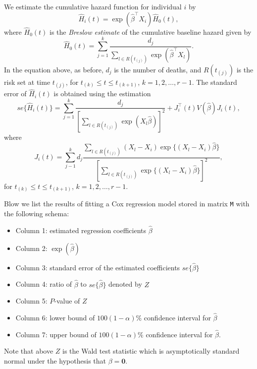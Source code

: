 We estimate the cumulative hazard function for individual $i$ by
\begin{equation*}
\hat{H}_i(t) = \exp(\hat{\beta}^\top X_i) \hat{H}_0(t), 
\end{equation*}
where $\hat{H}_0(t)$ is the \emph{Breslow estimate} of the cumulative baseline hazard given by
\begin{equation*}
\hat{H}_0(t) = \sum_{j=1}^{k} \frac{d_j}{\sum_{l\in R(t_{(j)})} \exp(\hat{\beta}^\top X_l)}.
\end{equation*}
In the equation above, as before, $d_j$ is the number of deaths, and $R(t_{(j)})$ is the risk set at time $t_{(j)}$, for $t_{(k)} \leq t \leq t_{(k+1)}$, $k=1,2,\ldots,r-1$.
The standard error of $\hat{H}_i(t)$ is obtained using the estimation
\begin{equation*}
se\{ \hat{H}_i(t) \} = \sum_{j=1}^{k} \frac{d_j}{ {\left[ \sum_{l\in R(t_{(j)})} \exp(X_l\hat{\beta}) \right]}^2 } + J_i^\top(t) V(\hat{\beta}) J_i(t),
\end{equation*}
where 
\begin{equation*}
J_i(t) = \sum_{j-1}^{k} d_j \frac{\sum_{l\in R(t_{(j)})} (X_l-X_i)\exp \{ (X_l-X_i)\hat{\beta} \}}{ {\left[ \sum_{l\in R(t_{(j)})} \exp\{(X_l-X_i)\hat{\beta}\} \right]}^2  },
\end{equation*}
for $t_{(k)} \leq t \leq t_{(k+1)}$, $k=1,2,\ldots,r-1$. 


\smallskip
{}
\smallskip

  
Blow we list the results of fitting a Cox regression model stored in matrix {\tt M} with the following schema:
\begin{itemize}
	\item Column 1: estimated regression coefficients $\hat{\beta}$
	\item Column 2: $\exp(\hat{\beta})$
	\item Column 3: standard error of the estimated coefficients $se\{\hat{\beta}\}$
	\item Column 4: ratio of $\hat{\beta}$ to $se\{\hat{\beta}\}$ denoted by $Z$  
	\item Column 5: $P$-value of $Z$ 
	\item Column 6: lower bound of $100(1-\alpha)\%$ confidence interval for $\hat{\beta}$
	\item Column 7: upper bound of $100(1-\alpha)\%$ confidence interval for $\hat{\beta}$.
\end{itemize}
Note that above $Z$ is the Wald test statistic which is asymptotically standard normal under the hypothesis that $\beta=\textbf{0}$.

